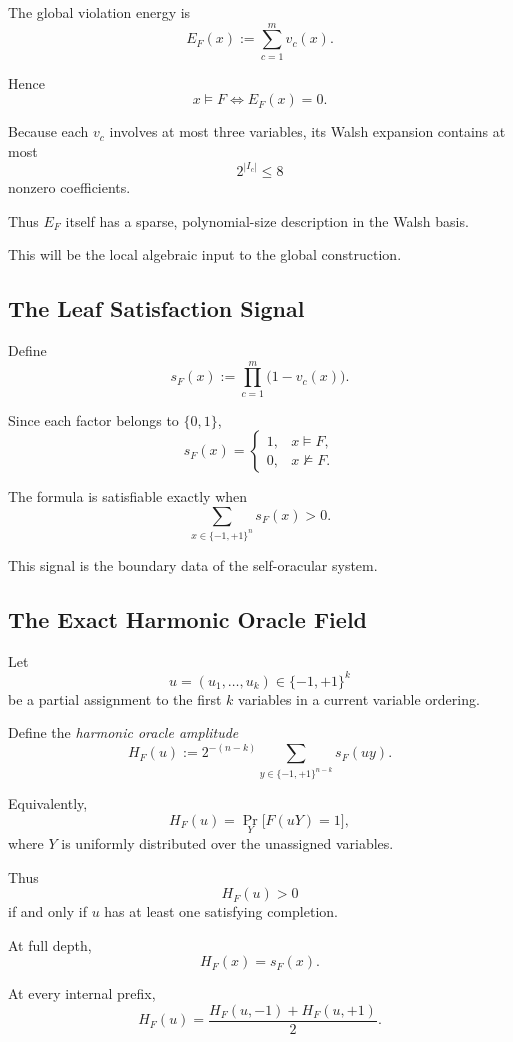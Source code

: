 \documentclass[11pt]{article}
\theoremstyle{plain}
\theoremstyle{definition}
\begin{document}
The global violation energy is
\[
    E_F(x)
    :=
    \sum_{c=1}^{m}v_c(x).
\]

Hence
\[
    x\models F
    \iff
    E_F(x)=0.
\]

Because each \(v_c\) involves at most three variables, its Walsh expansion
contains at most
\[
    2^{|I_c|}
    \leq 8
\]
nonzero coefficients.

Thus \(E_F\) itself has a sparse, polynomial-size description in the Walsh
basis.

This will be the local algebraic input to the global construction.

\subsection{The Leaf Satisfaction Signal}

Define
\[
    s_F(x)
    :=
    \prod_{c=1}^{m}\bigl(1-v_c(x)\bigr).
\]

Since each factor belongs to \(\{0,1\}\),
\[
    s_F(x)
    =
    \begin{cases}
        1,&x\models F,\\
        0,&x\not\models F.
    \end{cases}
\]

The formula is satisfiable exactly when
\[
    \sum_{x\in\{-1,+1\}^{n}} s_F(x)>0.
\]

This signal is the boundary data of the self-oracular system.

\subsection{The Exact Harmonic Oracle Field}

Let
\[
    u=(u_1,\dots,u_k)\in\{-1,+1\}^{k}
\]
be a partial assignment to the first \(k\) variables in a current variable
ordering.

Define the \emph{harmonic oracle amplitude}
\[
    H_F(u)
    :=
    2^{-(n-k)}
    \sum_{y\in\{-1,+1\}^{n-k}}
    s_F(uy).
\]

Equivalently,
\[
    H_F(u)
    =
    \Pr_{Y}
    \bigl[
        F(uY)=1
    \bigr],
\]
where \(Y\) is uniformly distributed over the unassigned variables.

Thus
\[
    H_F(u)>0
\]
if and only if \(u\) has at least one satisfying completion.

At full depth,
\[
    H_F(x)=s_F(x).
\]

At every internal prefix,
\[
\boxed{
H_F(u)
=
\frac{
    H_F(u,-1)
    +
    H_F(u,+1)
}{2}.
}
\]
\end{document}
